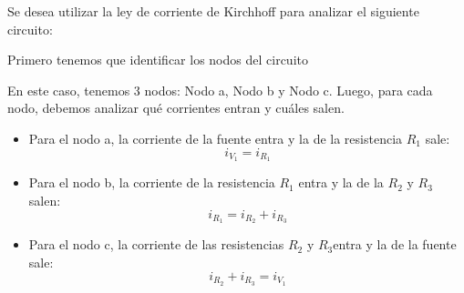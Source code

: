 \begin{example}
Se desea utilizar la ley de corriente de Kirchhoff para analizar el siguiente circuito:


Primero tenemos que identificar los nodos del circuito


    
En este caso, tenemos 3 nodos: Nodo a, Nodo b y Nodo c. Luego, para cada nodo, debemos analizar qué corrientes entran y cuáles salen.
\begin{itemize}
    \item Para el nodo a, la corriente de la fuente entra y la de la resistencia $R_1$ sale:
    \begin{equation*}
        i_{V_1}=i_{R_1}
    \end{equation*}

    \item Para el nodo b, la corriente de la resistencia $R_1$ entra y la de la $R_2$ y $R_3$ salen:
    \begin{equation*}
        i_{R_1}=i_{R_2}+i_{R_3}
    \end{equation*}

    \item Para el nodo c, la corriente de las resistencias $R_2$ y $R_3$entra y la de la fuente sale:
    \begin{equation*}
        i_{R_2}+i_{R_3}=i_{V_1}
    \end{equation*}
\end{itemize}
\end{example}
      
